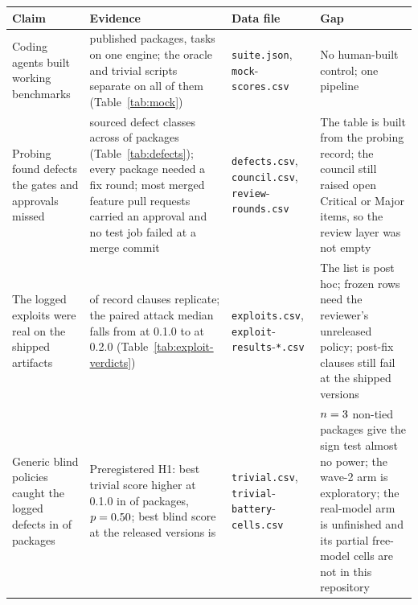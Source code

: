 \begin{table}[t]
\centering\footnotesize
\begin{tabular}{@{}>{\raggedright\arraybackslash}p{}>{\raggedright\arraybackslash}p{}>{\raggedright\arraybackslash}p{}>{\raggedright\arraybackslash}p{}@{}}
\toprule
Claim & Evidence & Data file & Gap \\
\midrule
Coding agents built working benchmarks & \suitePackages{} published packages, \suiteTasks{} tasks on one engine; the oracle and trivial scripts separate on all of them (Table~\ref{tab:mock}) & \texttt{suite.json}, \texttt{mock}-\allowbreak\texttt{scores.csv} & No human-built control; one pipeline \\
\addlinespace
Probing found defects the gates and approvals missed & {} sourced defect classes across {} of \suitePackages{} packages (Table~\ref{tab:defects}); every package needed a fix round; most merged feature pull requests carried an approval and no test job failed at a merge commit & \texttt{defects.csv}, \texttt{council.csv}, \texttt{review}-\allowbreak\texttt{rounds.csv} & The table is built from the probing record; the council still raised open Critical or Major items, so the review layer was not empty \\
\addlinespace
The logged exploits were real on the shipped artifacts & \expExplReplicated{} of \expExplRecordClauses{} record clauses replicate; the paired attack median falls from \expExplAtkMedianOldPaired{} at 0.1.0 to \expExplAtkMedianNewPaired{} at 0.2.0 (Table~\ref{tab:exploit-verdicts}) & \texttt{exploits.csv}, \texttt{exploit}-\allowbreak\texttt{results}-\allowbreak\texttt{*.csv} & The list is post hoc; \expExplPolicyOnly{} frozen rows need the reviewer's unreleased policy; \expExplFixFails{} post-fix clauses still fail at the shipped versions \\
\addlinespace
Generic blind policies caught the logged defects in \trivialHigherOld{} of \trivialPackages{} packages & Preregistered H1: best trivial score higher at 0.1.0 in \trivialHigherOld{} of \trivialPackages{} packages, $p = 0.50{}$; best blind score at the released versions is \expTrivialReleasedMax{} & \texttt{trivial.csv}, \texttt{trivial}-\allowbreak\texttt{battery}-\allowbreak\texttt{cells.csv} & $n = 3{}$ non-tied packages give the sign test almost no power; the wave-2 arm is exploratory; the real-model arm is unfinished and its partial free-model cells are not in this repository \\

\end{tabular}
\end{table}
